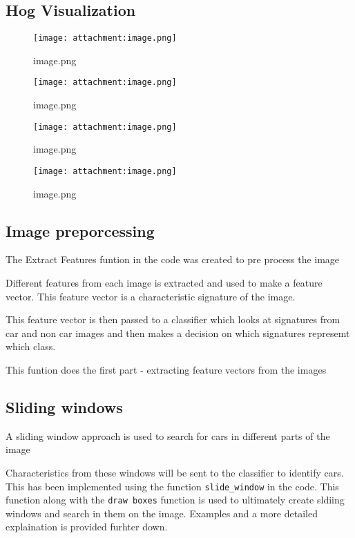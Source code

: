 \documentclass[11pt]{article}
\makeatletter
\def\maxwidth{\ifdim\Gin@nat@width>\linewidth\linewidth
    \else\Gin@nat@width\fi}
\let\Oldincludegraphics\includegraphics
\renewcommand{\includegraphics}[1]{\Oldincludegraphics[width=.8\maxwidth]{#1}}
\makeatother
\begin{document}
    \hypertarget{hog-visualization}{%
\subsection{Hog Visualization}\label{hog-visualization}}

\begin{figure}
\centering
\texttt{[image: attachment:image.png]}
\caption{image.png}
\end{figure}

    \begin{figure}
\centering
\texttt{[image: attachment:image.png]}
\caption{image.png}
\end{figure}

    \begin{figure}
\centering
\texttt{[image: attachment:image.png]}
\caption{image.png}
\end{figure}

    \begin{figure}
\centering
\texttt{[image: attachment:image.png]}
\caption{image.png}
\end{figure}

    \hypertarget{image-preporcessing}{%
\subsection{Image preporcessing}\label{image-preporcessing}}

The Extract Features funtion in the code was created to pre process the
image

Different features from each image is extracted and used to make a
feature vector. This feature vector is a characteristic signature of the
image.

This feature vector is then passed to a classifier which looks at
signatures from car and non car images and then makes a decision on
which signatures represemt which class.

This funtion does the first part - extracting feature vectors from the
images

    \hypertarget{sliding-windows}{%
\subsection{Sliding windows}\label{sliding-windows}}

A sliding window approach is used to search for cars in different parts
of the image

Characteristics from these windows will be sent to the classifier to
identify cars. This has been implemented using the function
\texttt{slide\_window} in the code. This function along with the
\texttt{draw\ boxes} function is used to ultimately create sldiing
windows and search in them on the image. Examples and a more detailed
explaination is provided furhter down.
\end{document}
